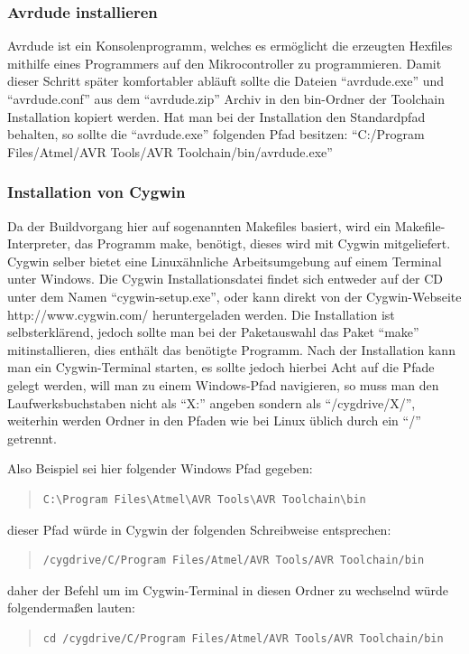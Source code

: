 \documentclass[a4paper,14pt,headsepline]{scrartcl}
\begin{document}
\subsubsection{Avrdude installieren}
Avrdude ist ein Konsolenprogramm, welches es ermöglicht die erzeugten Hexfiles mithilfe eines Programmers auf den Mikrocontroller zu programmieren. Damit dieser Schritt später komfortabler abläuft sollte die Dateien "`avrdude.exe"' und "`avrdude.conf"' aus dem "`avrdude.zip"' Archiv in den bin-Ordner der Toolchain Installation kopiert werden. Hat man bei der Installation den Standardpfad behalten, so sollte die "`avrdude.exe"' folgenden Pfad besitzen: "`C:/Program Files/Atmel/AVR Tools/AVR Toolchain/bin/avrdude.exe"'

\subsubsection{Installation von Cygwin}
Da der Buildvorgang hier auf sogenannten Makefiles basiert, wird ein Makefile-Interpreter, das Programm make, benötigt, dieses wird mit Cygwin mitgeliefert. Cygwin selber bietet eine Linuxähnliche Arbeitsumgebung auf einem Terminal unter Windows. Die Cygwin Installationsdatei findet sich entweder auf der CD unter dem Namen "`cygwin-setup.exe"', oder kann direkt von der Cygwin-Webseite http://www.cygwin.com/ heruntergeladen werden. Die Installation ist selbsterklärend, jedoch sollte man bei der Paketauswahl das Paket "`make"' mitinstallieren, dies enthält das benötigte Programm. Nach der Installation kann man ein Cygwin-Terminal starten, es sollte jedoch hierbei Acht auf die Pfade gelegt werden, will man zu einem Windows-Pfad navigieren, so muss man den Laufwerksbuchstaben nicht als "`X:"' angeben sondern als "`/cygdrive/X/"', weiterhin werden Ordner in den Pfaden wie bei Linux üblich durch ein "`/"' getrennt.

Also Beispiel sei hier folgender Windows Pfad gegeben:
\begin{quote}
\begin{verbatim}
C:\Program Files\Atmel\AVR Tools\AVR Toolchain\bin
\end{verbatim}
\end{quote}
dieser Pfad würde in Cygwin der folgenden Schreibweise entsprechen:
\begin{quote}
\begin{verbatim}
/cygdrive/C/Program Files/Atmel/AVR Tools/AVR Toolchain/bin
\end{verbatim}
\end{quote}
daher der Befehl um im Cygwin-Terminal in diesen Ordner zu wechselnd würde folgendermaßen lauten:
\begin{quote}
\begin{verbatim}
cd /cygdrive/C/Program Files/Atmel/AVR Tools/AVR Toolchain/bin
\end{verbatim}
\end{quote}
\end{document}
